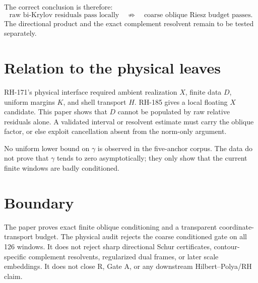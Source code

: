 \documentclass[12pt]{article}
\theoremstyle{remark}
\begin{document}
The correct conclusion is therefore:
\begin{equation}\label{eq:conclusion}
 \text{raw bi-Krylov residuals pass locally}
 \quad\not\Rightarrow\quad
 \text{coarse oblique Riesz budget passes}.
\end{equation}
The directional product and the exact complement resolvent remain to be
tested separately.

\section{Relation to the physical leaves}

RH-171's physical interface required ambient realization $X$, finite data
$D$, uniform margins $K$, and shell transport $H$.  RH-185 gives a local
floating $X$ candidate.  This paper shows that $D$ cannot be populated by
raw relative residuals alone.  A validated interval or resolvent estimate
must carry the oblique factor, or else exploit cancellation absent from the
norm-only argument.

No uniform lower bound on $\gamma$ is observed in the five-anchor corpus.
The data do not prove that $\gamma$ tends to zero asymptotically; they only
show that the current finite windows are badly conditioned.

\section{Boundary}

The paper proves exact finite oblique conditioning and a transparent
coordinate-transport budget.  The physical audit rejects the coarse
conditioned gate on all 126 windows.  It does not reject sharp directional
Schur certificates, contour-specific complement resolvents, regularized
dual frames, or later scale embeddings.  It does not close R, Gate A, or any
downstream Hilbert--Polya/RH claim.



\end{document}
